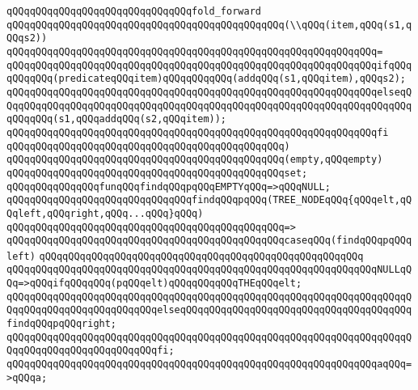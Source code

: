 \verb|qQQqqQQqqQQqqQQqqQQqqQQqqQQqqQQqfold_forward|\newline
\verb|qQQqqQQqqQQqqQQqqQQqqQQqqQQqqQQqqQQqqQQqqQQqqQQq(\\qQQq(item,qQQq(s1,qQQqs2))|\newline
\verb|qQQqqQQqqQQqqQQqqQQqqQQqqQQqqQQqqQQqqQQqqQQqqQQqqQQqqQQqqQQqqQQq=|\newline
\verb|qQQqqQQqqQQqqQQqqQQqqQQqqQQqqQQqqQQqqQQqqQQqqQQqqQQqqQQqqQQqqQQqifqQQqqQQqqQQq(predicateqQQqitem)qQQqqQQqqQQq(addqQQq(s1,qQQqitem),qQQqs2);|\newline
\verb|qQQqqQQqqQQqqQQqqQQqqQQqqQQqqQQqqQQqqQQqqQQqqQQqqQQqqQQqqQQqqQQqelseqQQqqQQqqQQqqQQqqQQqqQQqqQQqqQQqqQQqqQQqqQQqqQQqqQQqqQQqqQQqqQQqqQQqqQQqqQQqqQQq(s1,qQQqaddqQQq(s2,qQQqitem));|\newline
\verb|qQQqqQQqqQQqqQQqqQQqqQQqqQQqqQQqqQQqqQQqqQQqqQQqqQQqqQQqqQQqqQQqfi|\newline
\verb|qQQqqQQqqQQqqQQqqQQqqQQqqQQqqQQqqQQqqQQqqQQqqQQq)|\newline
\verb|qQQqqQQqqQQqqQQqqQQqqQQqqQQqqQQqqQQqqQQqqQQqqQQq(empty,qQQqempty)|\newline
\verb|qQQqqQQqqQQqqQQqqQQqqQQqqQQqqQQqqQQqqQQqqQQqqQQqset;|\newline
\newline
\verb|qQQqqQQqqQQqqQQqfunqQQqfindqQQqpqQQqEMPTYqQQq=>qQQqNULL;|\newline
\newline
\verb|qQQqqQQqqQQqqQQqqQQqqQQqqQQqqQQqfindqQQqpqQQq(TREE_NODEqQQq{qQQqelt,qQQqleft,qQQqright,qQQq...qQQq}qQQq)|\newline
\verb|qQQqqQQqqQQqqQQqqQQqqQQqqQQqqQQqqQQqqQQqqQQqqQQq=>|\newline
\verb|qQQqqQQqqQQqqQQqqQQqqQQqqQQqqQQqqQQqqQQqqQQqqQQqcaseqQQq(findqQQqpqQQqleft)|\newline
\verb|qQQqqQQqqQQqqQQqqQQqqQQqqQQqqQQqqQQqqQQqqQQqqQQqqQQqqQQq|\newline
\verb|qQQqqQQqqQQqqQQqqQQqqQQqqQQqqQQqqQQqqQQqqQQqqQQqqQQqqQQqqQQqqQQqNULLqQQq=>qQQqifqQQqqQQq(pqQQqelt)qQQqqQQqqQQqTHEqQQqelt;|\newline
\verb|qQQqqQQqqQQqqQQqqQQqqQQqqQQqqQQqqQQqqQQqqQQqqQQqqQQqqQQqqQQqqQQqqQQqqQQqqQQqqQQqqQQqqQQqqQQqqQQqelseqQQqqQQqqQQqqQQqqQQqqQQqqQQqqQQqqQQqqQQqfindqQQqpqQQqright;|\newline
\verb|qQQqqQQqqQQqqQQqqQQqqQQqqQQqqQQqqQQqqQQqqQQqqQQqqQQqqQQqqQQqqQQqqQQqqQQqqQQqqQQqqQQqqQQqqQQqqQQqfi;|\newline
\newline
\verb|qQQqqQQqqQQqqQQqqQQqqQQqqQQqqQQqqQQqqQQqqQQqqQQqqQQqqQQqqQQqqQQqaqQQq=>qQQqa;|\newline
